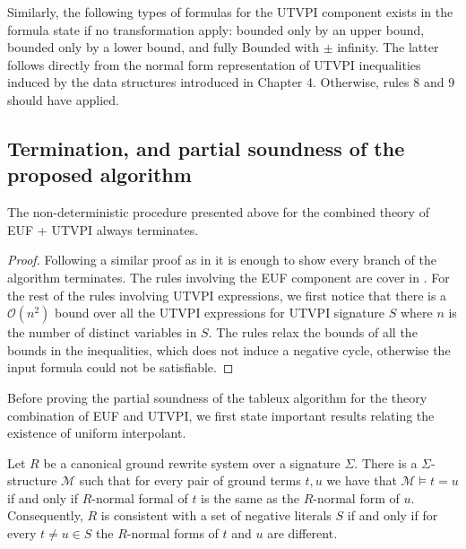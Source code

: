 Similarly, the following types of formulas for 
the UTVPI component exists in the
formula state if no transformation apply: bounded 
only by an upper bound, 
bounded only by a lower bound, and fully Bounded 
with $\pm$ infinity. The
latter follows directly from the normal 
form representation of UTVPI inequalities
induced by the data structures introduced 
in Chapter 4. Otherwise, rules
8 and 9 should have applied.

\subsection{Termination, and partial soundness of the
proposed algorithm}

\begin{lemma}
  The non-deterministic procedure presented 
  above for the combined theory of EUF + 
  UTVPI always terminates.
\end{lemma}

\begin{proof}
  Following a similar proof as in \cite{ghilardi2020compactly}
  it is enough to show every branch of the algorithm terminates.
  The rules involving the EUF component are cover in
  \cite{ghilardi2020compactly}. For the rest of the rules
  involving UTVPI expressions, we first notice that there is a 
  $\mathcal{O}(n^2)$ bound over all the UTVPI expressions
  for UTVPI signature $S$ where $n$ is the number of distinct
  variables in $S$. The rules relax the bounds of all the
  bounds in the inequalities, which does not induce a negative
  cycle, otherwise the input formula could not be satisfiable.
\end{proof} 

Before proving the partial soundness of the tableux algorithm 
for the theory combination of EUF and UTVPI, we first state
important results relating the existence of uniform 
interpolant.

\begin{lemma} \cite{ghilardi2020compactly} \label{rewriting_model_existance}
  Let $R$ be a canonical ground rewrite system over a signature
  $\Sigma$. There is a $\Sigma$-structure $\mathcal{M}$
  such that for every pair of ground terms $t, u$ we have
  that $\mathcal{M} \models t = u$ if and only if 
  $R$-normal formal of $t$ is the same as the $R$-normal form of
  $u$. Consequently, $R$ is consistent with a set of negative 
  literals $S$ if and only if for every $t \neq u \in S$ 
  the $R$-normal forms of $t$ and $u$ are different.
\end{lemma}

